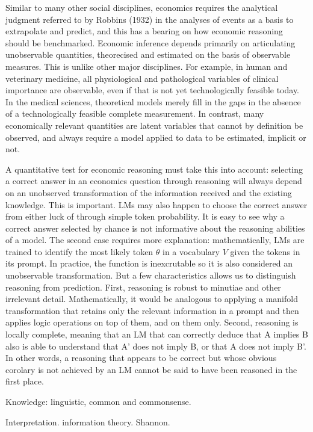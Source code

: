 \documentclass[
]{article}
\begin{document}
Similar to many other social disciplines, economics requires the
analytical judgment referred to by Robbins (1932) in the analyses of
events as a basis to extrapolate and predict, and this has a bearing on
how economic reasoning should be benchmarked. Economic inference depends
primarily on articulating unobservable quantities, theorecised and
estimated on the basis of observable measures. This is unlike other
major disciplines. For example, in human and veterinary medicine, all
physiological and pathological variables of clinical importance are
observable, even if that is not yet technologically feasible today. In
the medical sciences, theoretical models merely fill in the gaps in the
absence of a technologically feasible complete measurement. In contrast,
many economically relevant quantities are latent variables that cannot
by definition be observed, and always require a model applied to data to
be estimated, implicit or not.

A quantitative test for economic reasoning must take this into account:
selecting a correct answer in an economics question through reasoning
will always depend on an unobserved transformation of the information
received and the existing knowledge. This is important. LMs may also
happen to choose the correct answer from either luck of through simple
token probability. It is easy to see why a correct answer selected by
chance is not informative about the reasoning abilities of a model. The
second case requires more explanation: mathematically, LMs are trained
to identify the most likely token \(\theta\) in a vocabulary \(V\) given
the tokens in its prompt. In practice, the function is inexcrutable so
it is also considered an unobservable transformation. But a few
characteristics allows us to distinguish reasoning from prediction.
First, reasoning is robust to minutiae and other irrelevant detail.
Mathematically, it would be analogous to applying a manifold
transformation that retains only the relevant information in a prompt
and then applies logic operations on top of them, and on them only.
Second, reasoning is locally complete, meaning that an LM that can
correctly deduce that A implies B also is able to understand that A'
does not imply B, or that A does not imply B'. In other words, a
reasoning that appears to be correct but whose obvious corolary is not
achieved by an LM cannot be said to have been reasoned in the first
place.

Knowledge: linguistic, common and commonsense.

Interpretation. information theory. Shannon.
\end{document}
